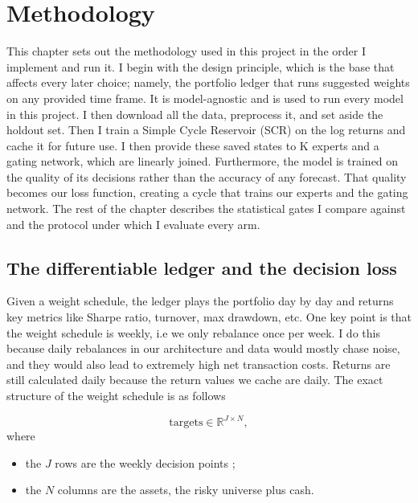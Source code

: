 
\chapter{Methodology}
\label{ch:methodology}

This chapter sets out the methodology used in this project in the order I implement and run it. I begin with the design
principle, which is the base that affects every later choice; namely, the portfolio ledger that runs suggested weights on any provided time frame. It is model-agnostic and is used to run every model in this project. I then download all the data, preprocess it, and set aside the holdout set. Then I train a Simple Cycle Reservoir (SCR) on the log returns and cache it for future use. I then provide these saved states to K experts and a gating network, which are linearly joined. Furthermore, the model is trained on the quality of its decisions rather than the accuracy of any forecast. That quality becomes our loss function, creating a cycle that trains our experts and the gating network. The rest of the chapter describes the statistical gates I compare against and the protocol under which I evaluate every arm. 

\section{The differentiable ledger and the decision loss}
\label{sec:ledger}

Given a weight schedule, the ledger plays the portfolio day by day and returns key metrics like Sharpe ratio, turnover, max drawdown, etc. One key point is that the weight schedule is weekly, i.e we only rebalance once per week. I do this because daily rebalances in our architecture and data would mostly chase noise, and they would also lead to extremely high net transaction costs. Returns are still calculated daily because the return values we cache are daily. The exact structure of the weight schedule is as follows

\begin{equation}
  \mathrm{targets} \in \mathbb{R}^{J \times N},
\end{equation}
where
\begin{itemize}
  \item the $J$ rows are the weekly decision points ; 
  \item the $N$ columns are the assets, the risky universe plus cash.
\end{itemize}


